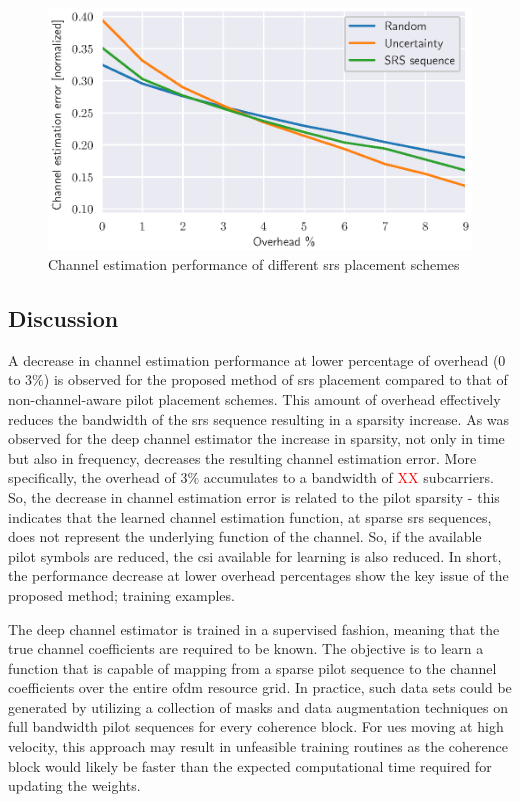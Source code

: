\begin{figure}
    \centering
    \includegraphics{chapters/part_uplink/figures/results/channel_estimation/overhead_comparison_scheme.eps}
    \caption{Channel estimation performance of different \gls{srs} placement schemes}
    \label{fig:overhead_channel_estimation}
\end{figure}


\subsection{Discussion}
A decrease in channel estimation performance at lower percentage of overhead ($0$ to $3\%$) is observed for the proposed method of \gls{srs} placement compared to that of non-channel-aware pilot placement schemes. This amount of overhead effectively reduces the bandwidth of the \gls{srs} sequence resulting in a sparsity increase. As was observed for the deep channel estimator the increase in sparsity, not only in time but also in frequency, decreases the resulting channel estimation error. More specifically, the overhead of $3\%$ accumulates to a bandwidth of \textcolor{red}{XX} subcarriers. So, the decrease in channel estimation error is related to the pilot sparsity - this indicates that the learned channel estimation function, at sparse \gls{srs} sequences, does not represent the underlying function of the channel. So, if the available pilot symbols are reduced, the \gls{csi} available for learning is also reduced. In short, the performance decrease at lower overhead percentages show the key issue of the proposed method; training examples.

The deep channel estimator is trained in a supervised fashion, meaning that the true channel coefficients are required to be known. The objective is to learn a function that is capable of mapping from a sparse pilot sequence to the channel coefficients over the entire \gls{ofdm} resource grid. In practice, such data sets could be generated by utilizing a collection of masks and data augmentation techniques on full bandwidth pilot sequences for every coherence block. For \glspl{ue} moving at high velocity, this approach may result in unfeasible training routines as the coherence block would likely be faster than the expected computational time required for updating the weights.

